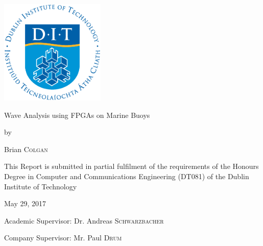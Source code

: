 \documentclass[12pt,a4paper]{report} %
\begin{document}
\begin{titlepage}
	\centering
	\includegraphics[height=5cm]{images/dit}\\
    \vspace{2cm}
	{\Large Wave Analysis using FPGAs on Marine Buoys\par}
	\vspace{2cm}
    {by \par}
	\vspace{2cm}
	{Brian \textsc{Colgan}\par}
    \vspace{4cm}
    {This Report is submitted in partial fulfilment of the requirements of the Honours Degree in Computer and Communications Engineering (DT081) of the Dublin Institute of Technology\par}
    \vspace{1cm}
	{May 29, 2017\par}
    \vspace{1cm}
	{Academic Supervisor: Dr. Andreas \textsc{Schwarzbacher}\par}
	{Company Supervisor: Mr. Paul \textsc{Drum}\par}
	\vfill
\end{titlepage}
\end{document}
